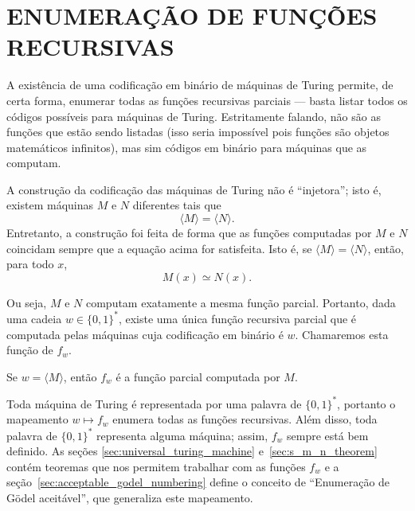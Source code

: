 \section{ENUMERAÇÃO DE FUNÇÕES RECURSIVAS}
\label{sec:definition_enumeration_of_recursive_functions}

A existência de uma codificação em binário de máquinas de Turing
permite, de certa forma,
enumerar todas as funções recursivas parciais
--- basta listar todos os códigos possíveis para máquinas de Turing.
Estritamente falando,
não são as funções que estão sendo listadas
(isso seria impossível pois funções são objetos matemáticos infinitos),
mas sim códigos em binário para máquinas que as computam.

A construção da codificação das máquinas de Turing não é ``injetora'';
isto é, existem máquinas $M$ e $N$ diferentes
tais que
\begin{equation*}
    \langle M \rangle = \langle N \rangle.
\end{equation*}
Entretanto,
a construção foi feita de forma que
as funções computadas por $M$ e $N$ coincidam
sempre que a equação acima for satisfeita.
Isto é,
se $\langle M \rangle = \langle N \rangle$,
então, para todo $x$,
\begin{equation*}
    M(x) \simeq N(x).
\end{equation*}

Ou seja,
$M$ e $N$ computam exatamente a mesma função parcial.
Portanto,
dada uma cadeia $w \in \{0, 1\}^*$,
existe uma única função recursiva parcial
que é computada pelas máquinas cuja codificação em binário é $w$.
Chamaremos esta função de $f_w$.

\begin{notation}
    Se $w = \langle M \rangle$, então $f_w$ é a função parcial computada por $M$.
\end{notation}

Toda máquina de Turing é representada por uma palavra de $\{0, 1\}^*$,
portanto o mapeamento $w \mapsto f_w$
enumera todas as funções recursivas.
Além disso,
toda palavra de $\{0, 1\}^*$ representa alguma máquina;
assim, $f_w$ sempre está bem definido.
As seções \ref{sec:universal_turing_machine} e~\ref{sec:s_m_n_theorem}
contém teoremas que nos permitem trabalhar com as funções $f_w$
e a seção~\ref{sec:acceptable_godel_numbering}
define o conceito de ``Enumeração de Gödel aceitável'',
que generaliza este mapeamento.
